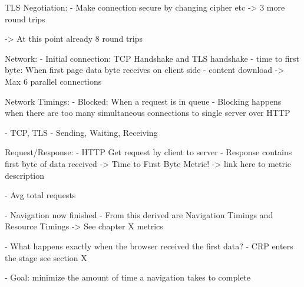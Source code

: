 


TLS Negotiation:
- Make connection secure by changing cipher etc
-> 3 more round trips

-> At this point already 8 round trips

Network:
- Initial connection: TCP Handshake and TLS handshake
- time to first byte: When first page data byte receives on client side
- content download
-> Max 6 parallel connections


Network Timings:
- Blocked: When a request is in queue
- Blocking happens when there are too many simultaneous connections to single server over HTTP

- TCP, TLS
- Sending, Waiting, Receiving







Request/Response:
- HTTP Get request by client to server
- Response contains first byte of data received -> Time to First Byte Metric! -> link here to metric description


- Avg total requests %






- Navigation now finished
- From this derived are Navigation Timings and Resource Timings -> See chapter X metrics 

- What happens exactly when the browser received the first data?
- CRP enters the stage see section X




- Goal: minimize the amount of time a navigation takes to complete


